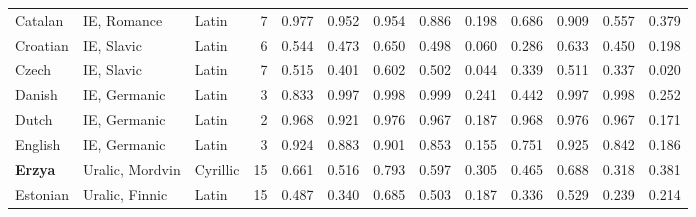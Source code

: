 \begin{tabular}{lllrrrrrrrrrr}
                Catalan &                     IE, Romance &      Latin &         7 &                       0.977 &                         0.952 &         0.954 &                  0.886 &            0.198 &                         0.686 &         0.909 &                  0.557 &            0.379 \\
               Croatian &                      IE, Slavic &      Latin &         6 &                       0.544 &                         0.473 &         0.650 &                  0.498 &            0.060 &                         0.286 &         0.633 &                  0.450 &            0.198 \\
                  Czech &                      IE, Slavic &      Latin &         7 &                       0.515 &                         0.401 &         0.602 &                  0.502 &            0.044 &                         0.339 &         0.511 &                  0.337 &            0.020 \\
                 Danish &                    IE, Germanic &      Latin &         3 &                       0.833 &                         0.997 &         0.998 &                  0.999 &            0.241 &                         0.442 &         0.997 &                  0.998 &            0.252 \\
                  Dutch &                    IE, Germanic &      Latin &         2 &                       0.968 &                         0.921 &         0.976 &                  0.967 &            0.187 &                         0.968 &         0.976 &                  0.967 &            0.171 \\
                English &                    IE, Germanic &      Latin &         3 &                       0.924 &                         0.883 &         0.901 &                  0.853 &            0.155 &                         0.751 &         0.925 &                  0.842 &            0.186 \\
         \textbf{Erzya} &                 Uralic, Mordvin &   Cyrillic &        15 &                       0.661 &                         0.516 &         0.793 &                  0.597 &            0.305 &                         0.465 &         0.688 &                  0.318 &            0.381 \\
               Estonian &                  Uralic, Finnic &      Latin &        15 &                       0.487 &                         0.340 &         0.685 &                  0.503 &            0.187 &                         0.336 &         0.529 &                  0.239 &            0.214 \\

\end{tabular}
